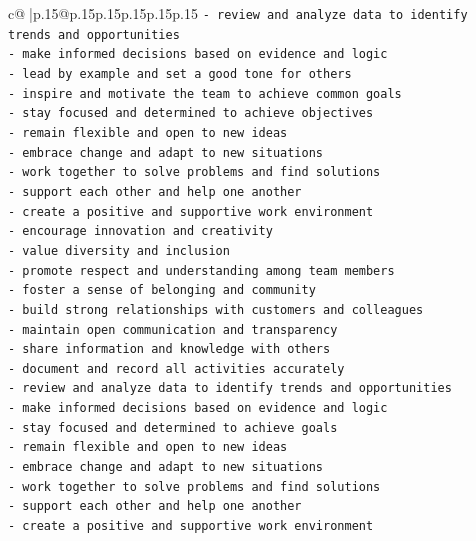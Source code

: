 \documentclass{article}
\begin{document}
{\begin{supertabular}{c@{$\;$}|p{.15\linewidth}@{}p{.15\linewidth}p{.15\linewidth}p{.15\linewidth}p{.15\linewidth}p{.15\linewidth}}
{{{\texttt{{-} review and analyze data to identify trends and opportunities} \\
\texttt{{-} make informed decisions based on evidence and logic} \\
\texttt{{-} lead by example and set a good tone for others} \\
\texttt{{-} inspire and motivate the team to achieve common goals} \\
\texttt{{-} stay focused and determined to achieve objectives} \\
\texttt{{-} remain flexible and open to new ideas} \\
\texttt{{-} embrace change and adapt to new situations} \\
\texttt{{-} work together to solve problems and find solutions} \\
\texttt{{-} support each other and help one another} \\
\texttt{{-} create a positive and supportive work environment} \\
\texttt{{-} encourage innovation and creativity} \\
\texttt{{-} value diversity and inclusion} \\
\texttt{{-} promote respect and understanding among team members} \\
\texttt{{-} foster a sense of belonging and community} \\
\texttt{{-} build strong relationships with customers and colleagues} \\
\texttt{{-} maintain open communication and transparency} \\
\texttt{{-} share information and knowledge with others} \\
\texttt{{-} document and record all activities accurately} \\
\texttt{{-} review and analyze data to identify trends and opportunities} \\
\texttt{{-} make informed decisions based on evidence and logic} \\
\texttt{{-} stay focused and determined to achieve goals} \\
\texttt{{-} remain flexible and open to new ideas} \\
\texttt{{-} embrace change and adapt to new situations} \\
\texttt{{-} work together to solve problems and find solutions} \\
\texttt{{-} support each other and help one another} \\
\texttt{{-} create a positive and supportive work environment} \\
}}}
\end{supertabular}}
\end{document}
